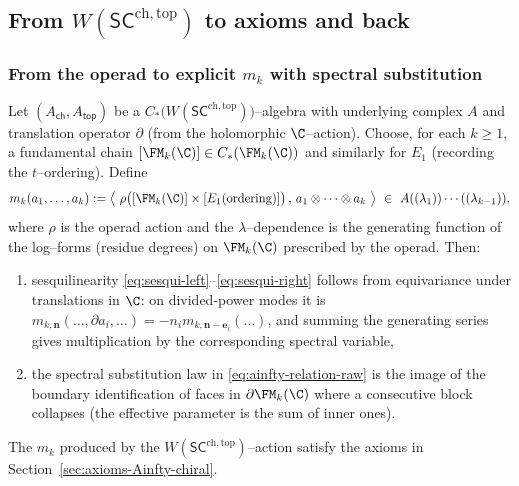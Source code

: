 \subsection{From $W(\mathsf{SC}^{\mathrm{ch,top}})$ to axioms and back}
\label{sec:operad-to-axioms}
\label{sec:equivalence}

\subsubsection{From the operad to explicit $m_k$ with spectral substitution}
\label{subsec:operad-to-mk}
Let $(A_{\mathsf{ch}},A_{\mathsf{top}})$ be a $C_\ast\!\bigl(W(\mathsf{SC}^{\mathrm{ch,top}})\bigr)$--algebra with underlying complex $A$ and translation operator $\partial$ (from the holomorphic \(\C\)--action). Choose, for each $k\ge1$, a fundamental chain $[\FM_k(\C)]\in C_\ast(\FM_k(\C))$ and similarly for $E_1$ (recording the $t$--ordering). Define
\[
m_k(a_1,\dots,a_k)
:= \bigl\langle\ \rho\bigl([\FM_k(\C)]\times [E_1(\text{ordering})]\bigr)\,,\, a_1\otimes\cdots\otimes a_k\ \bigr\rangle
\ \in\ A((\lambda_1))\cdots((\lambda_{k-1})),
\]
where $\rho$ is the operad action and the \(\lambda\)--dependence is the generating function of the log--forms (residue degrees) on $\FM_k(\C)$ prescribed by the operad.
Then:
\begin{enumerate}[label=(\alph*)]
 \item sesquilinearity \eqref{eq:sesqui-left}--\eqref{eq:sesqui-right}
 follows from equivariance under translations in $\C$: on divided-power
 modes it is
 \(m_{k,\mathbf n}(\ldots,\partial a_i,\ldots)
 =-n_i m_{k,\mathbf n-\mathbf e_i}(\ldots)\), and summing the
 generating series gives multiplication by the corresponding
 spectral variable,
 \item the spectral substitution law in \eqref{eq:ainfty-relation-raw} is the image of the boundary identification of faces in $\partial\FM_k(\C)$ where a consecutive block collapses (the effective parameter is the sum of inner ones).
\end{enumerate}

\begin{proposition}
\label{prop:operad-implies-axioms}
The $m_k$ produced by the $W(\mathsf{SC}^{\mathrm{ch,top}})$--action satisfy the axioms in Section~\ref{sec:axioms-Ainfty-chiral}.
\end{proposition}

